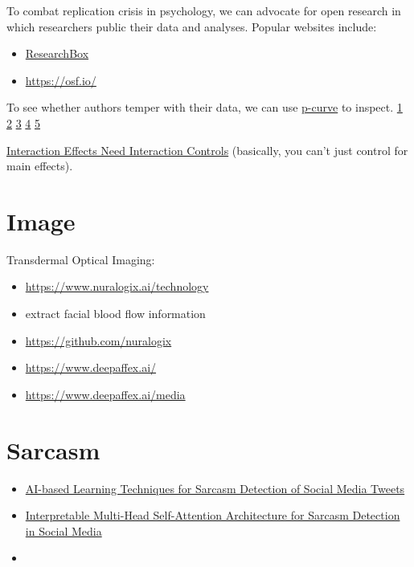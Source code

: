 \documentclass[
]{book}
\begin{document}
To combat replication crisis in psychology, we can advocate for open research in which researchers public their data and analyses. Popular websites include:

\begin{itemize}
\item
  \href{https://researchbox.org/index.php}{ResearchBox}
\item
  \url{https://osf.io/}
\end{itemize}

To see whether authors temper with their data, we can use \href{http://p-curve.com/}{p-curve} to inspect. \href{https://datacolada.org/66}{1} \href{https://datacolada.org/67}{2} \href{https://datacolada.org/49}{3} \href{https://datacolada.org/45}{4} \href{https://datacolada.org/91}{5}

\href{https://datacolada.org/80}{Interaction Effects Need Interaction Controls} (basically, you can't just control for main effects).

\hypertarget{image}{%
\chapter{Image}\label{image}}

Transdermal Optical Imaging:

\begin{itemize}
\item
  \url{https://www.nuralogix.ai/technology}
\item
  extract facial blood flow information
\item
  \url{https://github.com/nuralogix}
\item
  \url{https://www.deepaffex.ai/}
\item
  \url{https://www.deepaffex.ai/media}
\end{itemize}

\hypertarget{sarcasm}{%
\chapter{Sarcasm}\label{sarcasm}}

\begin{itemize}
\item
  \href{https://link.springer.com/article/10.1007/s42979-020-00336-3}{AI-based Learning Techniques for Sarcasm Detection of Social Media Tweets}
\item
  \href{https://www.mdpi.com/1099-4300/23/4/394}{Interpretable Multi-Head Self-Attention Architecture for Sarcasm Detection in Social Media}
\item
\end{itemize}
\end{document}
